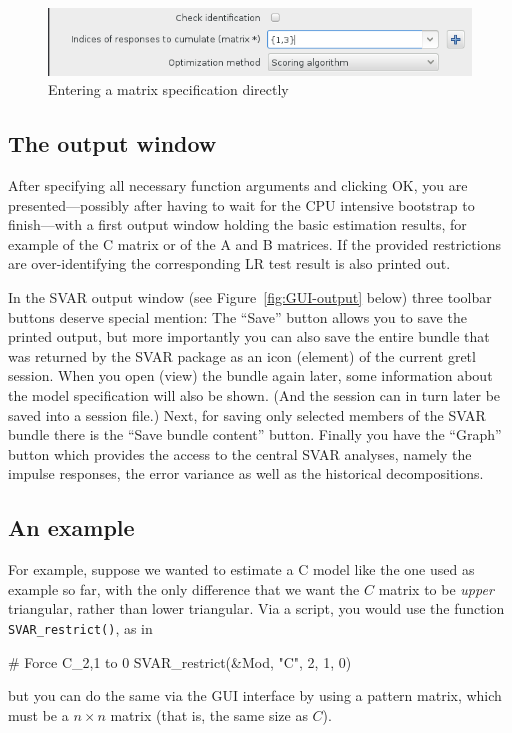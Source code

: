 \documentclass[a4paper,10pt]{article}
\newcommand{\app}[1]{\textsf{#1}}
\newcounter{script}[section]
\begin{document}
\begin{figure}[htbp]
  \centering
  \includegraphics[scale=0.5]{dialog_mat.png}
  \caption{Entering a matrix specification directly}
  \label{fig:matrix-entry}
\end{figure}

\subsection{The output window}

After specifying all necessary function arguments and clicking OK, you
are presented---possibly after having to wait for the CPU intensive
bootstrap to finish---with a first output window holding the basic
estimation results, for example of the C matrix or of the A and B
matrices. If the provided restrictions are over-identifying the
corresponding LR test result is also printed out.

In the SVAR output window (see Figure~\ref{fig:GUI-output} below)
three toolbar buttons deserve special mention: The ``Save'' button
allows you to save the printed output, but more importantly you can
also save the entire bundle that was returned by the SVAR package as
an icon (element) of the current \app{gretl} session. When you open
(view) the bundle again later, some information about the model
specification will also be shown. (And the session can in turn later
be saved into a session file.) Next, for saving only selected members
of the SVAR bundle there is the ``Save bundle content''
button. Finally you have the ``Graph'' button which provides the
access to the central SVAR analyses, namely the impulse responses, the
error variance as well as the historical decompositions.

\subsection{An example}

For example, suppose we wanted to estimate a C model like the one used
as example so far, with the only difference that we want the $C$
matrix to be \emph{upper} triangular, rather than lower
triangular. Via a script, you would use the function
\texttt{SVAR\_restrict()}, as in
\begin{code}
# Force C_{2,1} to 0
SVAR_restrict(&Mod, "C", 2, 1, 0)
\end{code}
but you can do the same via the GUI interface by using a pattern
matrix, which must be a $n \times n$ matrix (that is, the same
size as $C$). 
\end{document}
